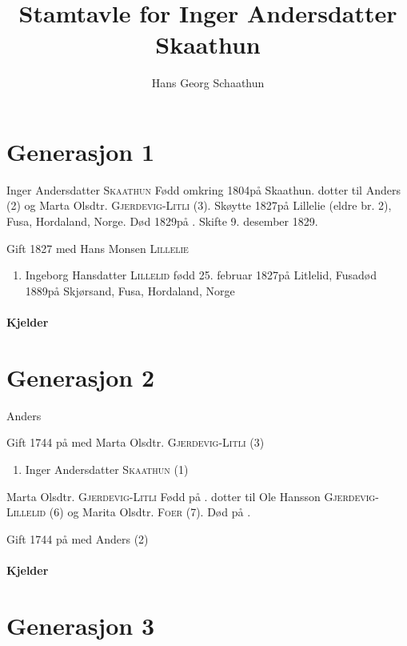 \documentclass[pdftex,twocolumn,10pt,oneside]{scrartcl}
\begin{document}
\author{Hans Georg Schaathun}
\title{Stamtavle for Inger Andersdatter Skaathun}
\maketitle
\section*{Generasjon 1}

Inger Andersdatter \textsc{Skaathun} Fødd omkring 1804på Skaathun.  dotter til Anders \textsc{} (\textsc{2}) og Marta Olsdtr. \textsc{Gjerdevig-Litli} (\textsc{3}). Skøytte 1827på Lillelie (eldre br. 2), Fusa, Hordaland, Norge. Død 1829på . Skifte 9. desember 1829. \cite[s. 135b]{@S228@}

Gift 1827  med Hans Monsen \textsc{Lillelie}\begin{enumerate}
  \item Ingeborg Hansdatter \textsc{Lillelid} fødd 25. februar 1827på Litlelid, Fusadød 1889på Skjørsand, Fusa, Hordaland, Norge
\end{enumerate}


\paragraph{Kjelder}
\cite[s. 578]{@S63@}\cite{@S140@}\section*{Generasjon 2}

Anders \textsc{} 

Gift 1744 på  med Marta Olsdtr. \textsc{Gjerdevig-Litli} (\textsc{3})\begin{enumerate}
  \item Inger Andersdatter \textsc{Skaathun} (\textsc{1})
\end{enumerate}



Marta Olsdtr. \textsc{Gjerdevig-Litli} Fødd på .  dotter til Ole Hansson \textsc{Gjerdevig-Lillelid} (\textsc{6}) og Marita Olsdtr. \textsc{Foer} (\textsc{7}). Død på . 

Gift 1744 på  med Anders \textsc{} (\textsc{2})\paragraph{Kjelder}
\cite[s. 578]{@S63@}\section*{Generasjon 3}
\end{document}
